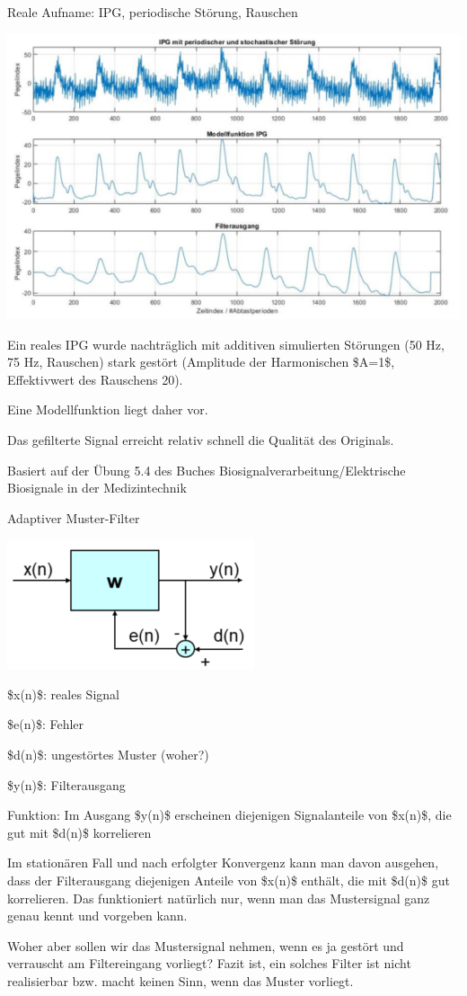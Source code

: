 \documentclass[a4paper]{article}
\begin{document}
\begin{multicols}{3}
  Reale Aufname: IPG, periodische Störung, Rauschen

  \begin{itemize*}
    \item \includegraphics[width=.5\linewidth]{Assets/Biosignalverarbeitung-adaptiver-filter-reale-aufnahme.png}
    \item Ein reales IPG wurde nachträglich mit additiven simulierten Störungen (50 Hz, 75 Hz, Rauschen) stark gestört (Amplitude der Harmonischen \$A=1\$, Effektivwert des Rauschens 20).
    \item Eine Modellfunktion liegt daher vor.
    \item Das gefilterte Signal erreicht relativ schnell die Qualität des Originals.
    \item Basiert auf der Übung 5.4 des Buches Biosignalverarbeitung/Elektrische Biosignale in der Medizintechnik
  \end{itemize*}

  Adaptiver Muster-Filter

  \begin{itemize*}
    \item \includegraphics[width=.5\linewidth]{Assets/Biosignalverarbeitung-adaptiver-filter-aufbau.png}
    \item \$x(n)\$: reales Signal
    \item \$e(n)\$: Fehler
    \item \$d(n)\$: ungestörtes Muster (woher?)
    \item \$y(n)\$: Filterausgang
    \item Funktion: Im Ausgang \$y(n)\$ erscheinen diejenigen Signalanteile von \$x(n)\$, die gut mit \$d(n)\$ korrelieren
    \item Im stationären Fall und nach erfolgter Konvergenz kann man davon ausgehen, dass der Filterausgang diejenigen Anteile von \$x(n)\$ enthält, die mit \$d(n)\$ gut korrelieren. Das funktioniert natürlich nur, wenn man das Mustersignal ganz genau kennt und vorgeben kann.
    \item Woher aber sollen wir das Mustersignal nehmen, wenn es ja gestört und verrauscht am Filtereingang vorliegt? Fazit ist, ein solches Filter ist nicht realisierbar bzw. macht keinen Sinn, wenn das Muster vorliegt.
  \end{itemize*}


\end{multicols}
\end{document}
